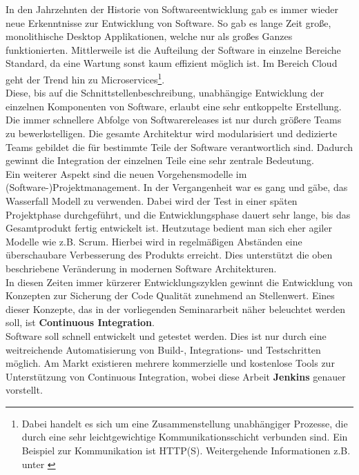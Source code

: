 In den Jahrzehnten der Historie von Softwareentwicklung gab es immer wieder neue Erkenntnisse zur Entwicklung von Software. So gab es lange Zeit große, monolithische Desktop Applikationen, welche nur als großes Ganzes funktionierten. Mittlerweile ist die Aufteilung der Software in einzelne Bereiche Standard, da eine Wartung sonst kaum effizient möglich ist. Im Bereich Cloud geht der Trend hin zu Microservices\footnote{Dabei handelt es sich um eine Zusammenstellung unabhängiger Prozesse, die durch eine sehr leichtgewichtige Kommunikationsschicht verbunden sind. Ein Beispiel zur Kommunikation ist HTTP(S). Weitergehende Informationen z.B. unter \cite{fowler-Microservice}}.\\
Diese, bis auf die Schnittstellenbeschreibung, unabhängige Entwicklung der einzelnen Komponenten von Software, erlaubt eine sehr entkoppelte Erstellung. Die immer schnellere Abfolge von Softwarereleases ist nur durch größere Teams zu bewerkstelligen. Die gesamte Architektur wird modularisiert und dedizierte Teams gebildet die für bestimmte Teile der Software verantwortlich sind. Dadurch gewinnt die Integration der einzelnen Teile eine sehr zentrale Bedeutung.\\
Ein weiterer Aspekt sind die neuen Vorgehensmodelle im (Software-)Projektmanagement. In der Vergangenheit war es gang und gäbe, das Wasserfall Modell zu verwenden. Dabei wird der Test in einer späten Projektphase durchgeführt, und  die Entwicklungsphase dauert sehr lange, bis das Gesamtprodukt fertig entwickelt ist. Heutzutage bedient man sich eher agiler Modelle wie z.B. Scrum. Hierbei wird in regelmäßigen Abständen eine überschaubare Verbesserung des Produkts erreicht. Dies unterstützt die oben beschriebene Veränderung in modernen Software Architekturen. \\
In diesen Zeiten immer kürzerer Entwicklungszyklen gewinnt die Entwicklung von Konzepten zur Sicherung der Code Qualität zunehmend an Stellenwert. Eines dieser Konzepte, das in der vorliegenden Seminararbeit näher beleuchtet werden soll, ist \textbf{Continuous Integration}.\\
 Software soll schnell entwickelt und getestet werden. Dies ist nur durch eine weitreichende  Automatisierung von Build-, Integrations- und Testschritten möglich. Am Markt existieren mehrere kommerzielle und kostenlose Tools zur Unterstützung von Continuous Integration, wobei diese Arbeit \textbf{Jenkins} genauer vorstellt.
